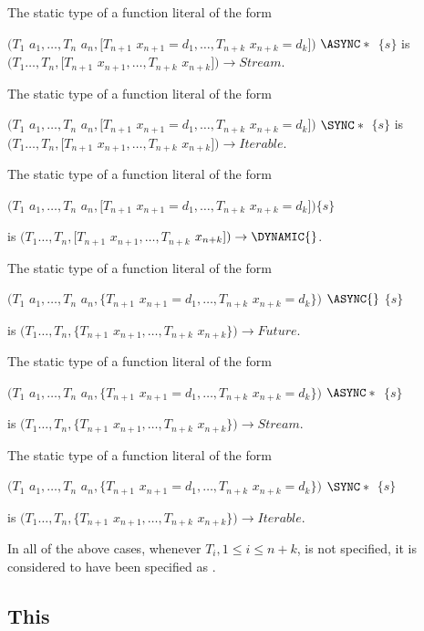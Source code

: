 \documentclass{article}
\begin{document}
\LMHash{}
The static type of a function literal of the form

$(T_1$ $a_1, \ldots, T_n$ $a_n, [T_{n+1}$ $x_{n+1} = d_1, \ldots,  T_{n+k}$ $x_{n+k}= d_k])$ $ \ASYNC*{}$ $\{s\}$
is $(T_1 \ldots, T_n, [T_{n+1}$ $x_{n+1}, \ldots, T_{n+k}$ $x_{n+k}]) \rightarrow Stream$.

\LMHash{}
The static type of a function literal of the form

$(T_1$ $a_1, \ldots, T_n$ $a_n, [T_{n+1}$ $x_{n+1} = d_1, \ldots,  T_{n+k}$ $x_{n+k}= d_k])$ $ \SYNC*{}$ $\{s\}$
is $(T_1 \ldots, T_n, [T_{n+1}$ $x_{n+1}, \ldots, T_{n+k}$ $x_{n+k}]) \rightarrow Iterable$.


\LMHash{}
The static type of a function literal of the form

$(T_1$ $a_1, \ldots, T_n$ $a_n, [T_{n+1}$ $x_{n+1} = d_1, \ldots,  T_{n+k}$ $x_{n+k}= d_k])\{s\}$

is $(T_1 \ldots, T_n, [T_{n+1}$ $x_{n+1}, \ldots, T_{n+k}$ $x_{n+k}]) \rightarrow  \DYNAMIC{}$.


\LMHash{}
The static type of a function literal of the form

$(T_1$ $a_1, \ldots, T_n$ $a_n, \{T_{n+1}$ $x_{n+1} = d_1, \ldots,  T_{n+k}$ $x_{n+k} = d_k\})$ $\ASYNC{}$ $\{s\}$

is $(T_1 \ldots, T_n, \{T_{n+1}$ $x_{n+1}, \ldots, T_{n+k}$ $x_{n+k}\}) \rightarrow  Future{}$.

\LMHash{}
The static type of a function literal of the form

$(T_1$ $a_1, \ldots, T_n$ $a_n, \{T_{n+1}$ $x_{n+1} = d_1, \ldots,  T_{n+k}$ $x_{n+k} = d_k\})$ $\ASYNC*{}$ $\{s\}$

is $(T_1 \ldots, T_n, \{T_{n+1}$ $x_{n+1}, \ldots, T_{n+k}$ $x_{n+k}\}) \rightarrow  Stream{}$.

\LMHash{}
The static type of a function literal of the form

$(T_1$ $a_1, \ldots, T_n$ $a_n, \{T_{n+1}$ $x_{n+1} = d_1, \ldots,  T_{n+k}$ $x_{n+k} = d_k\})$ $\SYNC*{}$ $\{s\}$

is $(T_1 \ldots, T_n, \{T_{n+1}$ $x_{n+1}, \ldots, T_{n+k}$ $x_{n+k}\}) \rightarrow  Iterable{}$.

\LMHash{}
In all of the above cases, whenever $T_i, 1 \le i \le n+k$, is not specified, it is considered to have been specified as  \DYNAMIC{}.


\subsection{ This}
\end{document}
